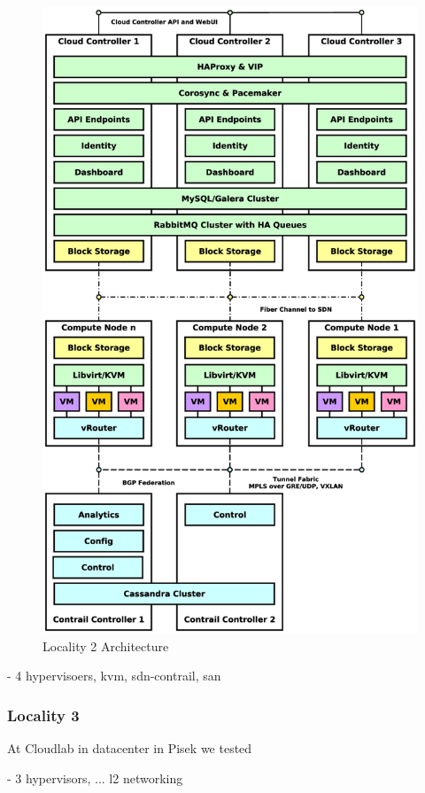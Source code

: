 \begin{figure}[!h]
\centering
\includegraphics[scale=.2]{img/use_case_ha_sdn.eps}
\caption{Locality 2 Architecture}
\label{fig:cm}
\end{figure}

- 4 hypervisoers, kvm, sdn-contrail, san

\subsubsection{Locality 3}

At Cloudlab in datacenter in Pisek we tested



- 3 hypervisors, ... l2 networking 

